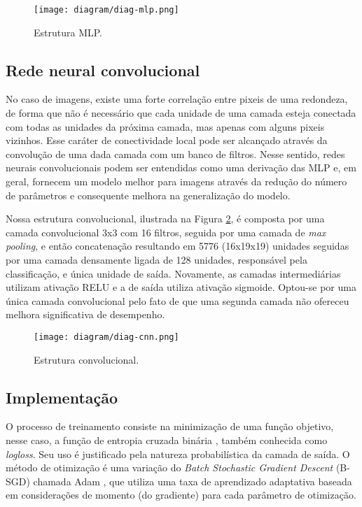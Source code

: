         \begin{figure}
        \centering
        \texttt{[image: diagram/diag-mlp.png]}
        \caption{Estrutura MLP.}
        \label{fig:diag-mlp}
        \end{figure}

    \subsection{Rede neural convolucional}
         No caso de imagens, existe uma forte correlação entre pixeis de uma redondeza, de forma que não é necessário que cada unidade de uma camada esteja conectada com todas as unidades da próxima camada, mas apenas com alguns pixeis vizinhos. Esse caráter de conectividade local pode ser alcançado através da convolução de uma dada camada com um banco de filtros. Nesse sentido, redes neurais convolucionais podem ser entendidas como uma derivação das MLP e, em geral, fornecem um modelo melhor para imagens através da redução do número de parâmetros e consequente melhora na generalização do modelo.

         Nossa estrutura convolucional, ilustrada na Figura \ref{fig:diag-cnn}, é composta por uma camada convolucional 3x3 com 16 filtros, seguida por uma camada de \textit{max pooling}, e então concatenação resultando em 5776 (16x19x19) unidades seguidas por uma camada densamente ligada de 128 unidades, responsável pela classificação, e única unidade de saída. Novamente, as camadas intermediárias utilizam ativação RELU e a de saída utiliza ativação sigmoide. Optou-se por uma única camada convolucional pelo fato de que uma segunda camada não ofereceu melhora significativa de desempenho.

        \begin{figure}
        \centering
        \texttt{[image: diagram/diag-cnn.png]}
        \caption{Estrutura convolucional.}
        \label{fig:diag-cnn}
        \end{figure}

    \subsection{Implementação}
        O processo de treinamento consiste na minimização de uma função objetivo, nesse caso, a função de entropia cruzada binária \cite{DLbook}, também conhecida como \textit{logloss}. Seu uso é justificado pela natureza probabilística da camada de saída. O método de otimização é uma variação do \textit{Batch Stochastic Gradient Descent} (B-SGD) chamada Adam \cite{kingma2014adam}, que utiliza uma taxa de aprendizado adaptativa baseada em considerações de momento (do gradiente) para cada parâmetro de otimização.

